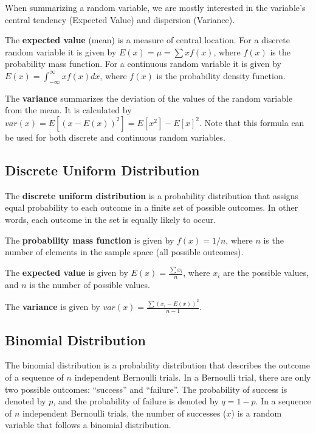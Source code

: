 \documentclass[
  letterpaper,
  DIV=11,
  numbers=noendperiod]{scrreprt}
\begin{document}
When summarizing a random variable, we are mostly interested in the
variable's central tendency (Expected Value) and dispersion (Variance).

The \textbf{expected value} (mean) is a measure of central location. For
a discrete random variable it is given by \(E(x)=\mu=\sum xf(x)\), where
\(f(x)\) is the probability mass function. For a continuous random
variable it is given by \(E(x)= \int_{-\infty}^{\infty} x f(x) dx\),
where \(f(x)\) is the probability density function.

The \textbf{variance} summarizes the deviation of the values of the
random variable from the mean. It is calculated by
\(var(x)=E[(x-E(x))^2]=E[x^2]-E[x]^2\). Note that this formula can be
used for both discrete and continuous random variables.

\hypertarget{discrete-uniform-distribution}{%
\subsection*{Discrete Uniform
Distribution}\label{discrete-uniform-distribution}}

The \textbf{discrete uniform distribution} is a probability distribution
that assigns equal probability to each outcome in a finite set of
possible outcomes. In other words, each outcome in the set is equally
likely to occur.

The \textbf{probability mass function} is given by \(f(x)=1/n\), where
\(n\) is the number of elements in the sample space (all possible
outcomes).

The \textbf{expected value} is given by \(E(x)=\frac {\sum x_i}{n}\),
where \(x_i\) are the possible values, and \(n\) is the number of
possible values.

The \textbf{variance} is given by
\(var(x)=\frac {\sum (x_i-E(x))^2}{n-1}\).

\hypertarget{binomial-distribution}{%
\subsection*{Binomial Distribution}\label{binomial-distribution}}

The binomial distribution is a probability distribution that describes
the outcome of a sequence of \(n\) independent Bernoulli trials. In a
Bernoulli trial, there are only two possible outcomes: ``success'' and
``failure''. The probability of success is denoted by \(p\), and the
probability of failure is denoted by \(q = 1 - p\). In a sequence of
\(n\) independent Bernoulli trials, the number of successes (\(x\)) is a
random variable that follows a binomial distribution.
\end{document}
